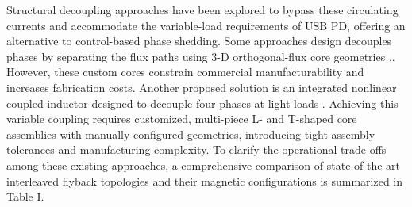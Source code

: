 \documentclass[lettersize,journal]{IEEEtran}
\begin{document}
Structural decoupling approaches have been explored to bypass these circulating currents and accommodate the variable-load requirements of USB PD, offering an alternative to control-based phase shedding. Some approaches design decouples phases by separating the flux paths using  3-D orthogonal-flux core geometries \cite{Ouyang},\cite{fayyaz2025}. However, these custom cores constrain commercial manufacturability and increases fabrication costs. Another proposed solution is an integrated nonlinear coupled inductor designed to decouple four phases at light loads \cite{Z_Li_2025}. Achieving this variable coupling requires customized, multi-piece L- and T-shaped core assemblies with manually configured geometries, introducing tight assembly tolerances and manufacturing complexity. To clarify the operational trade-offs among these existing approaches, a comprehensive comparison of state-of-the-art interleaved flyback topologies and their magnetic configurations is summarized in Table I.
\end{document}
